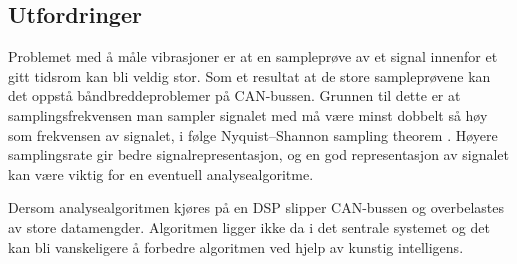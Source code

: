 \subsection{Utfordringer}

Problemet med å måle vibrasjoner er at en sampleprøve av et signal innenfor et gitt tidsrom kan bli veldig stor. Som
et resultat at de store sampleprøvene kan det oppstå båndbreddeproblemer på CAN-bussen. Grunnen til dette
er at samplingsfrekvensen man sampler signalet med må være
minst dobbelt så høy som frekvensen av signalet, i følge Nyquist–Shannon sampling theorem \cite{nyquist}. Høyere
samplingsrate gir bedre signalrepresentasjon, og en god
representasjon av signalet kan være viktig for en eventuell analysealgoritme.

Dersom analysealgoritmen kjøres på en DSP slipper CAN-bussen og overbelastes av store datamengder.
Algoritmen ligger ikke da i det sentrale systemet og det kan bli vanskeligere å forbedre algoritmen ved hjelp av kunstig intelligens. 
